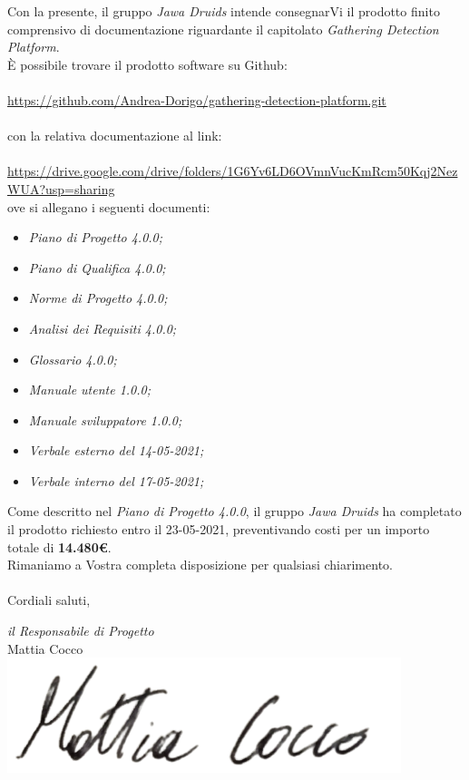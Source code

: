 \documentclass[a4paper,12pt]{report}
\begin{document}
Con la presente, il gruppo \textit{Jawa Druids} intende consegnarVi il prodotto finito comprensivo di documentazione riguardante il capitolato \textit{Gathering Detection Platform}.
\vspace{1cm}
\\
È possibile trovare il prodotto software su Github: \\
\\
\url{https://github.com/Andrea-Dorigo/gathering-detection-platform.git} \\
\\
con la relativa documentazione al link: \\
\\
\url{https://drive.google.com/drive/folders/1G6Yv6LD6OVmnVucKmRcm50Kqj2NezWUA?usp=sharing}
\\
\clearpage
ove si allegano i seguenti documenti:
\begin{itemize}
  \item \textit{Piano di Progetto 4.0.0;}
  \item \textit{Piano di Qualifica 4.0.0;}
  \item \textit{Norme di Progetto 4.0.0;}
  \item \textit{Analisi dei Requisiti 4.0.0;}
  \item \textit{Glossario 4.0.0;}
  \item \textit{Manuale utente 1.0.0;}
  \item \textit{Manuale sviluppatore 1.0.0;}
  \item \textit{Verbale esterno del 14-05-2021;}
  \item \textit{Verbale interno del 17-05-2021;}
\end{itemize}
\vspace{0.7cm}

Come descritto nel \textit{Piano di Progetto 4.0.0}, il gruppo \textit{Jawa Druids} ha completato il prodotto richiesto entro il 23-05-2021, preventivando costi per un importo totale di \textbf{14.480\euro}.\\
Rimaniamo a Vostra completa disposizione per qualsiasi chiarimento.\\
\vspace{0.3cm}
\\
Cordiali saluti,
\begin{flushright}
  \textit{il Responsabile di Progetto} \\
  Mattia Cocco \\
  \includegraphics[width=0.3\linewidth]{immagini/firme/firma_mattia.png}\\[4ex]
\end{flushright}
\end{document}
